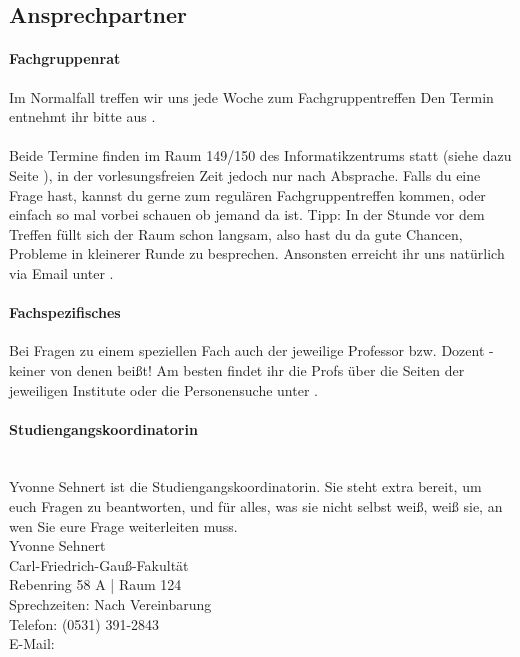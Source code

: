 
\subsection{Ansprechpartner}
\paragraph{Fachgruppenrat}

Im Normalfall treffen wir uns jede Woche zum Fachgruppentreffen
Den  Termin entnehmt ihr bitte aus
.
\\\\
Beide Termine finden im Raum 149/150 des Informatikzentrums statt
(siehe dazu Seite \pageref{campuskarte}), in der vorlesungsfreien Zeit
jedoch nur nach Absprache. 
  Falls du eine Frage hast, kannst du gerne zum regulären
  Fachgruppentreffen kommen, oder einfach so mal vorbei schauen ob
  jemand da ist. Tipp: In der Stunde vor dem Treffen füllt sich der
  Raum schon langsam, also hast du da gute Chancen, Probleme in
  kleinerer Runde zu besprechen. 
 Ansonsten erreicht ihr uns natürlich via
Email unter .

\paragraph{Fachspezifisches}
Bei Fragen zu einem speziellen Fach auch der jeweilige Professor
bzw. Dozent - keiner von denen beißt! Am besten findet ihr die Profs
über die Seiten der jeweiligen Institute oder die Personensuche unter
.
\paragraph{\small Studiengangskoordinatorin} \ \\ Yvonne Sehnert ist die Studiengangskoordinatorin. Sie steht extra bereit,
um euch Fragen zu beantworten, und für alles, was sie nicht selbst
weiß, weiß sie, an wen Sie eure Frage weiterleiten muss.\\
{
Yvonne Sehnert\\
Carl-Friedrich-Gauß-Fakultät\\
Rebenring 58 A | Raum 124\\
Sprechzeiten: Nach  Vereinbarung\\
Telefon: (0531) 391-2843\\
E-Mail: 
}

